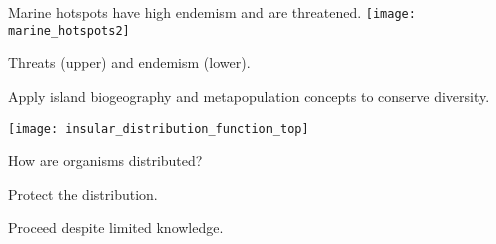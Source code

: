 \documentclass[t]{beamer}
\begin{document}
\begin{frame}[plain]{Marine hotspots have high endemism and are threatened.}
	\centering
		\texttt{[image: marine\_hotspots2]}

	Threats (upper) and endemism (lower).
		
\end{frame}

%
%

%			
%			
%			
%			

\begin{frame}{Apply island biogeography and metapopulation concepts to conserve diversity.}
	
	\vspace{-\baselineskip}
	
	\begin{multicols}{2}
			\texttt{[image: insular\_distribution\_function\_top]}
			
			\columnbreak

			\vspace*{0.11ex}
			
			How are organisms distributed?
			
			\bigskip
			
			Protect the distribution.
			
			\bigskip
			
			Proceed despite limited knowledge.

	\end{multicols}
\end{frame}
\end{document}
